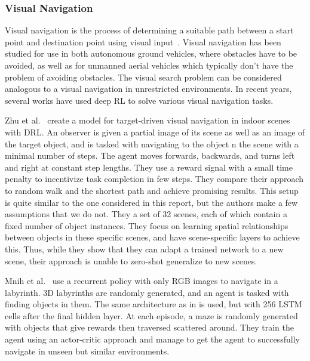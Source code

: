 
\subsubsection{Visual Navigation}

Visual navigation is the process of determining a suitable path between a start point and destination point using visual input~\cite{bonin-font_visnav_2008}.
Visual navigation has been studied for use in both autonomous ground vehicles, where obstacles have to be avoided, as well as for unmanned aerial vehicles which typically don't have the problem of avoiding obstacles.
The visual search problem can be considered analogous to a visual navigation in unrestricted environments.
In recent years, several works have used deep RL to solve various visual navigation tasks.

Zhu et al.~\cite{zhu_target_2016} create a model for target-driven visual navigation in indoor scenes with DRL.
An observer is given a partial image of its scene as well as an image of the target object, and is tasked with navigating to the object n the scene with a minimal number of steps.
The agent moves forwards, backwards, and turns left and right at constant step lengths.
They use a reward signal with a small time penalty to incentivize task completion in few steps.
They compare their approach to random walk and the shortest path and achieve promising results.
This setup is quite similar to the one considered in this report, but the authors make a few assumptions that we do not.
They a set of 32 scenes, each of which contain a fixed number of object instances.
They focus on learning spatial relationships between objects in these specific scenes, and have scene-specific layers to achieve this.
Thus, while they show that they can adapt a trained network to a new scene, their approach is unable to zero-shot generalize to new scenes.

Mnih et al.~\cite{mnih_asynchronous_2016} use a recurrent policy with only RGB images to navigate in a labyrinth.
3D labyrinths are randomly generated, and an agent is tasked with finding objects in them.
The same architecture as in \cite{mnih_human_2015} is used, but with 256 LSTM cells after the final hidden layer.
At each episode, a maze is randomly generated with objects that give rewards then traversed scattered around.
They train the agent using an actor-critic approach and manage to get the agent to successfully navigate in unseen but similar environments.

